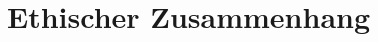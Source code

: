 \documentclass{article}
\begin{document}
\section {Ethischer Zusammenhang}







\printbibliography
\end{document}
